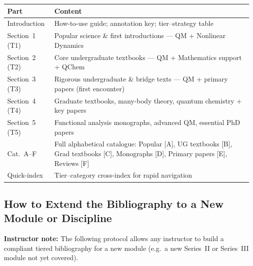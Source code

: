 \documentclass[11pt,a4paper]{article}
\newcommand{\instructornote}[1]{%
  \begin{tcolorbox}[notebox]\textbf{Instructor note:} #1\end{tcolorbox}%
}
\begin{document}
\begin{center}
\begin{tabular}{lp{10cm}}
\toprule
\textbf{Part} & \textbf{Content}\\
\midrule
Introduction & How-to-use guide; annotation key; tier--strategy table\\
Section~1 (T1) & Popular science \& first introductions --- QM + Nonlinear Dynamics\\
Section~2 (T2) & Core undergraduate textbooks --- QM + Mathematics support + QChem\\
Section~3 (T3) & Rigorous undergraduate \& bridge texts --- QM + primary papers (first encounter)\\
Section~4 (T4) & Graduate textbooks, many-body theory, quantum chemistry + key papers\\
Section~5 (T5) & Functional analysis monographs, advanced QM, essential PhD papers\\
Cat.~A--F     & Full alphabetical catalogue: Popular [A], UG textbooks [B],
                Grad textbooks [C], Monographs [D], Primary papers [E], Reviews [F]\\
Quick-index   & Tier--category cross-index for rapid navigation\\
\bottomrule
\end{tabular}
\end{center}

\subsection{How to Extend the Bibliography to a New Module or Discipline}

\instructornote{%
The following protocol allows any instructor to build a compliant tiered bibliography
for a new module (e.g.\ a new Series~II or Series~III module not yet covered).
}
\end{document}
